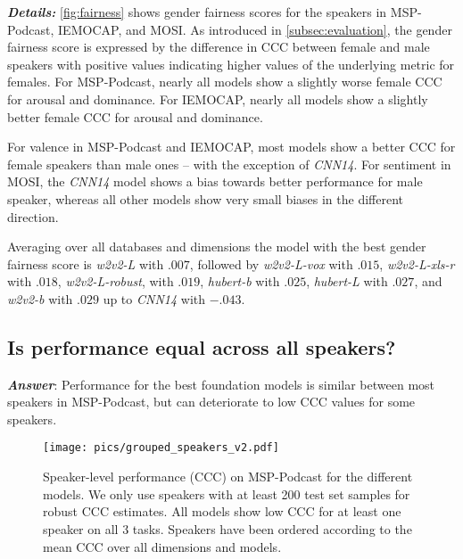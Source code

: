 \documentclass{article}
\newcommand\cnn{\mbox{\emph{CNN14}}}
\newcommand\wbase{\mbox{\emph{w2v2-b}}}
\newcommand\hbase{\mbox{\emph{hubert-b}}}
\newcommand\wlarge{\mbox{\emph{w2v2-L}}}
\newcommand\hlarge{\mbox{\emph{hubert-L}}}
\newcommand\wrobust{\mbox{\emph{w2v2-L-robust}}}
\newcommand\wvox{\mbox{\emph{w2v2-L-vox}}}
\newcommand\wxlsr{\mbox{\emph{w2v2-L-xls-r}}}
\newcommand\msppodcast{\mbox{MSP-Podcast}}
\newcommand\iemocap{\mbox{IEMOCAP}}
\newcommand\mosi{\mbox{MOSI}}
\begin{document}
\noindent
\emph{\textbf{Details:}}
\cref{fig:fairness} shows gender fairness scores
for the speakers in {\msppodcast}, {\iemocap}, and {\mosi}.
As introduced in \cref{subsec:evaluation},
the gender fairness score is expressed
by the difference in \ac{CCC} between female and male speakers
with positive values indicating higher values of the underlying metric for females.
For {\msppodcast},
nearly all models show a slightly worse female \ac{CCC} for arousal and dominance. 
For {\iemocap},
nearly all models show a slightly better female \ac{CCC} for arousal and dominance.

For valence in {\msppodcast} and {\iemocap}, 
most models show a better \ac{CCC} for female speakers than male ones -- 
with the exception of {\cnn}. 
For sentiment in {\mosi}, the {\cnn} model shows a bias towards better performance for male speaker,
whereas all other models show very small biases in the different direction.

Averaging over all databases and dimensions the model with the best gender fairness score is {\wlarge} with $.007$, followed by {\wvox} with $.015$, {\wxlsr} with $.018$, {\wrobust}, with $.019$, {\hbase} with $.025$, {\hlarge} with $.027$, and {\wbase} with $.029$ up to {\cnn} with $-.043$.





\subsection{Is performance equal across all speakers?}
\label{subsec:speakers}

\emph{\textbf{Answer}}:
Performance for the best foundation models is similar between most speakers in {\msppodcast},
but can deteriorate to low \ac{CCC} values for some speakers.

\begin{figure}[t]
    \centering
    \texttt{[image: pics/grouped\_speakers\_v2.pdf]}
    \caption{
        Speaker-level performance (\acs{CCC}) on {\msppodcast} for the different models.
        We only use speakers with at least 200 test set samples for robust \acs{CCC} estimates.
        All models show low \ac{CCC} for at least one speaker on all 3 tasks.
        Speakers have been ordered according to the mean \acs{CCC} over all dimensions and models.
    }
    \label{fig:speaker:plots}
\end{figure}
\end{document}
